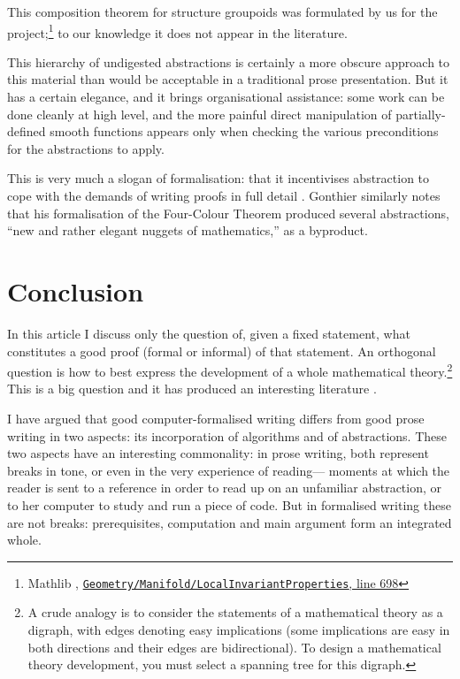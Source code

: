 \documentclass[12pt]{llncs}
\begin{document}
This composition theorem for structure groupoids was formulated by us for the project;\footnote{
  Mathlib \cite{Mathlib}, \href{https://github.com/leanprover-community/mathlib4/blob/21b3a48ba0f69a4ae9eb44dbacbc4de43a6290bf/Mathlib/Geometry/Manifold/LocalInvariantProperties.lean\#L698}{\texttt{Geometry/Manifold/LocalInvariantProperties}, line 698}
} 
to our knowledge it does not appear in the literature.

This hierarchy of undigested abstractions is certainly a more obscure approach to this material
than would be acceptable in a traditional prose presentation.
But it has a certain elegance,
and it brings organisational assistance:
some work can be done cleanly at high level,
and the more painful direct manipulation of partially-defined smooth functions
appears only when checking the various preconditions for the abstractions to apply.

This is very much a slogan of formalisation: that it
incentivises abstraction 
to cope with the demands of writing proofs in full detail \cite{CT24}.
Gonthier \cite{Gon08Notices} similarly notes that his formalisation of the Four-Colour Theorem produced several abstractions, ``new and rather elegant nuggets of mathematics,'' as a byproduct.

\section{Conclusion}

In this article I discuss only the question of,
given a fixed statement,
what constitutes a good proof (formal or informal) of that statement.
An orthogonal question
is how to best express the development of a whole mathematical theory.\footnote{
A crude analogy is to consider the statements of a mathematical theory as a digraph,
with edges denoting easy implications
(some implications are easy in both directions and their edges are bidirectional).
To design a mathematical theory development,
you must select a spanning tree for this digraph.
}
This is a big question and it has produced an interesting literature \cite{ACKMRS20,Gou22}.

I have argued that good computer-formalised writing differs from good prose writing in two aspects:
its incorporation of algorithms and of abstractions.
These two aspects have an interesting commonality:
in prose writing, both represent breaks in tone, or even in the very experience of reading---%
moments at which the reader is sent to a reference in order to read up on an unfamiliar abstraction,
or to her computer to study and run a piece of code.
But in formalised writing these are not breaks:
prerequisites, computation  
and main argument form an integrated whole.
\end{document}

